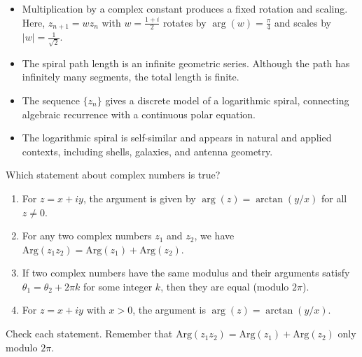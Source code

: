 \begin{takeaways}

\begin{itemize}[leftmargin=*]
  \item Multiplication by a complex constant produces a fixed rotation and scaling. Here, $z_{n+1} = wz_n$ with $w=\frac{1+i}{2}$ rotates by $\arg(w)=\frac{\pi}{4}$ and scales by $|w|=\frac{1}{\sqrt{2}}$.
  \item The spiral path length is an infinite geometric series. Although the path has infinitely many segments, the total length is finite.
  \item The sequence $\{z_n\}$ gives a discrete model of a logarithmic spiral, connecting algebraic recurrence with a continuous polar equation.
  \item The logarithmic spiral is self-similar and appears in natural and applied contexts, including shells, galaxies, and antenna geometry.
\end{itemize}

\end{takeaways}

\begin{problem}
Which statement about complex numbers is true?

\begin{enumerate}[label=(\Alph*),leftmargin=*]
  \item For $z = x + iy$, the argument is given by $\arg(z) = \arctan(y/x)$ for all $z \neq 0$.
  \item For any two complex numbers $z_1$ and $z_2$, we have $\text{Arg}(z_1 z_2) = \text{Arg}(z_1) + \text{Arg}(z_2)$.
  \item If two complex numbers have the same modulus and their arguments satisfy $\theta_1 = \theta_2 + 2\pi k$ for some integer $k$, then they are equal (modulo $2\pi$).
  \item For $z = x + iy$ with $x > 0$, the argument is $\arg(z) = \arctan(y/x)$.
\end{enumerate}
\end{problem}

\begin{hint}
Check each statement. Remember that $\text{Arg}(z_1z_2) = \text{Arg}(z_1) + \text{Arg}(z_2)$ only modulo $2\pi$.
\end{hint}


